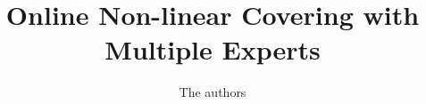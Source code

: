 \documentclass[11pt,a4paper]{article}
\begin{document}
\title{Online Non-linear Covering with Multiple Experts}

\author{The authors}

\maketitle






\clearpage




\clearpage

\appendix

\end{document}

